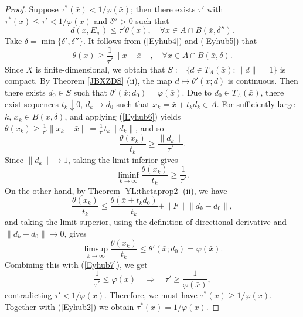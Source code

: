 \documentclass[11pt]{article}
\begin{document}
\begin{proof}
  Suppose $\tau^*(\bar{x}) < 1/	\varphi(\bar{x})$; then there exists $\tau'$ with $\tau^*(\bar{x}) \le \tau' < 1/	\varphi(\bar{x})$ and $\delta'' > 0$ such that
   \begin{equation}\label{Eyhub5}
  d(x, E_w) \le \tau' \theta(x),   \quad  \forall x \in A \cap B(\bar{x}, \delta'').
  \end{equation}
  Take $\delta = \min\{\delta', \delta ''\}$.  
  It follows from  (\ref{Eyhub4}) and (\ref{Eyhub5})   that
   \begin{equation}\label{Eyhub6}
  	\theta(x) \ge \frac{1}{\tau'} \|x - \bar{x}\|,   \quad	\forall  x \in A \cap B(\bar{x}, \delta).
  \end{equation}
  Since $X$ is finite-dimensional, we obtain that  $S := \{d \in T_A(\bar{x}) : \|d\| = 1\}$ is compact. By Theorem   \ref{JBXZDS}  (ii),  the map $d \mapsto \theta'( x; d)$ is   continuous.  Then there exists  $d_0 \in S$  such that $\theta'(\bar{x}; d_0) = 	\varphi(\bar{x})$.  Due to $d_0 \in  T_A(\bar{x}) $, 
   there exist sequences $t_k \downarrow 0$, $d_k \to d_0$ such that $x_k = \bar{x} + t_k d_k \in A$. For sufficiently large $k$, $x_k \in B(\bar{x}, \delta)$, and applying (\ref{Eyhub6})  yields $\theta(x_k) \ge \frac{1}{\tau'} \|x_k - \bar{x}\| = \frac{1}{\tau'} t_k \|d_k\|$, and so
  \[
  \frac{\theta(x_k)}{t_k} \ge \frac{\|d_k\|}{\tau'}.
  \]
  Since $\|d_k\| \to 1$, taking the limit inferior gives 
   \begin{equation}\label{Eyhub7}
   \liminf_{k \to \infty} \frac{\theta(x_k)}{t_k} \ge \frac{1}{\tau'}.
   \end{equation}
  On the other hand, by Theorem   \ref{YL:thetaprop2} (ii),  we have
  \[
  \frac{\theta(x_k)}{t_k} \le \frac{\theta(\bar{x} + t_k d_0)}{t_k} + \|F\|   \|d_k - d_0\|,
  \]
  and taking the limit superior, using the definition of directional derivative and $\|d_k - d_0\| \to 0$, gives
  \[
  \limsup_{k \to \infty} \frac{\theta(x_k)}{t_k} \le \theta'(\bar{x}; d_0) = 	\varphi(\bar{x}).
  \]
  Combining this with  (\ref{Eyhub7}), we get
  \[
  \frac{1}{\tau'} \le 	\varphi(\bar{x}) \quad \Longrightarrow \quad \tau' \ge \frac{1}{	\varphi(\bar{x})},
  \]
  contradicting $\tau' < 1/	\varphi(\bar{x})$.  Therefore, we must have $\tau^*(\bar{x}) \ge 1/	\varphi(\bar{x})$. Together with (\ref{Eyhub2}) we obtain $\tau^*(\bar{x}) = 1/	\varphi(\bar{x})$.
 

\end{proof}
\end{document}
